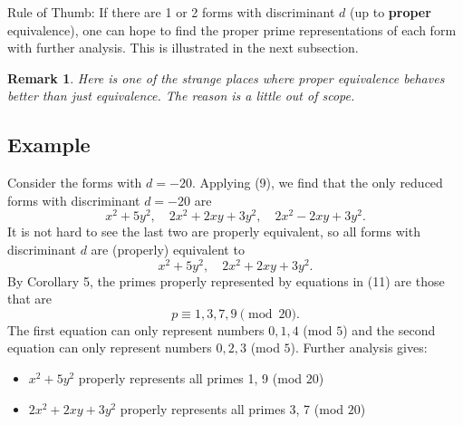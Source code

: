 \documentclass[12pt]{article}
\newtheorem*{remark}{Remark}
\begin{document}
\subsubsection{}
Rule of Thumb: If there are 1 or 2 forms with discriminant $d$ (up to \textbf{proper} equivalence), one can hope to find the proper prime representations of each form with further analysis. This is illustrated in the next subsection.
\begin{remark}
    Here is one of the strange places where proper equivalence behaves better than just equivalence. The reason is a little out of scope.
\end{remark}

\subsection{Example}
Consider the forms with $d = -20$. Applying (9), we find that the only reduced forms with discriminant $d = -20$ are
\begin{equation*}
    x^{2} + 5y^{2}, \quad 2x^{2}+2xy+3y^{2}, \quad 2x^{2}-2xy+3y^{2}.
\end{equation*}
It is not hard to see the last two are properly equivalent, so all forms with discriminant $d$ are (properly) equivalent to
\begin{equation}
    x^{2} + 5y^{2}, \quad 2x^{2}+2xy+3y^{2}.
\end{equation}
By Corollary 5, the primes properly represented by equations in (11) are those that are
\begin{equation*}
    p \equiv 1, 3, 7, 9 \pmod{20}.
\end{equation*}
The first equation can only represent numbers $0, 1, 4$ (mod $5$) and the second equation can only represent numbers $0, 2, 3$ (mod $5$). Further analysis gives:
\begin{itemize}
    \item $x^{2} + 5y^{2}$ properly represents all primes 1, 9 (mod $20$)
    \item $2x^{2}+2xy+3y^{2}$ properly represents all primes 3, 7 (mod $20$)
\end{itemize}
\end{document}
